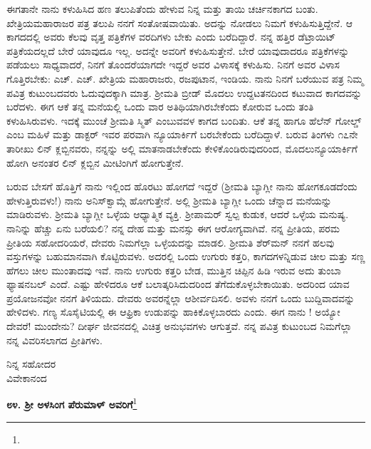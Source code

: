 ಈಗತಾನೇ ನಾನು ಕಳುಹಿಸಿದ ಹಣ ತಲುಪಿತೆಂದು ಹೇಳುವ ನಿನ್ನ ಮತ್ತು ತಾಯಿ ಚರ್ಚಿನಕಾಗದ ಬಂತು. ಖೇತ್ರಿಯಮಹಾರಾಜರ ಪತ್ರ ತಲುಪಿ ನನಗೆ ಸಂತೋಷವಾಯಿತು. ಅದನ್ನು ನೋಡಲು ನಿಮಗೆ ಕಳುಹಿಸುತ್ತಿದ್ದೇನೆ. ಆ ಕಾಗದದಲ್ಲಿ ಅವರು ಕೆಲವು ವೃತ್ತ ಪತ್ರಿಕೆಗಳ ವರದಿಗಳು ಬೇಕು ಎಂದು ಬರೆದಿದ್ದಾರೆ. ನನ್ನ ಹತ್ತಿರ ಡೆಟ್ರಾಯಿಟ್ ಪತ್ರಿಕೆಯದಲ್ಲದೆ ಬೇರೆ ಯಾವುದೂ ಇಲ್ಲ. ಅದನ್ನೇ ಅವರಿಗೆ ಕಳುಹಿಸುತ್ತೇನೆ. ಬೇರೆ ಯಾವುದಾದರೂ ಪತ್ರಿಕೆಗಳನ್ನು ಪಡೆಯಲು ಸಾಧ್ಯವಾದರೆ, ನಿನಗೆ ತೊಂದರೆಯಾಗದೇ ಇದ್ದರೆ ಅವರ ವಿಳಾಸಕ್ಕೆ ಕಳುಹಿಸು. ನಿನಗೆ ಅವರ ವಿಳಾಸ ಗೊತ್ತಿರಬೇಕು: ಎಚ್. ಎಚ್. ಖೇತ್ರಿಯ ಮಹಾರಾಜರು, ರಜಪುಟಾನ, ಇಂಡಿಯ. ನಾನು ನಿನಗೆ ಬರೆಯುವ ಪತ್ರ ನಿಮ್ಮ ಪವಿತ್ರ ಕುಟುಂಬದವರು ಓದುವುದಕ್ಕಾಗಿ ಮಾತ್ರ. ಶ‍್ರೀಮತಿ ಬ್ರೀಡ್ ಮೊದಲು ಉದ್ದಟತನದಿಂದ ಕಟುವಾದ ಕಾಗದವನ್ನು ಬರೆದಳು. ಈಗ ಆಕೆ ತನ್ನ ಮನೆಯಲ್ಲಿ ಒಂದು ವಾರ ಅತಿಥಿಯಾಗಿರಬೇಕೆಂದು ಕೋರುವ ಒಂದು ತಂತಿ ಕಳುಹಿಸಿರುವಳು. ಇದಕ್ಕೆ ಮುಂಚೆ ಶ‍್ರೀಮತಿ ಸ್ಮಿತ್ ಎಂಬುವವಳ ಕಾಗದ ಬಂದಿತು. ಆಕೆ ತನ್ನ ಹಾಗೂ ಹೆಲೆನ್ ಗೋಲ್ಡ್ ಎಂಬ ಮಹಿಳೆ ಮತ್ತು ಡಾಕ್ಟರ್ \enginline{-} ಇವರ ಪರವಾಗಿ ನ್ಯೂಯಾರ್ಕಿಗೆ ಬರಬೇಕೆಂದು ಬರೆದಿದ್ದಾಳೆ. ಬರುವ ತಿಂಗಳು ೧೭ನೇ ತಾರೀಖು ಲಿನ್ ಕ್ಲಬ್ಬಿನವರು, ನನ್ನನ್ನು ಅಲ್ಲಿ ಮಾತನಾಡಬೇಕೆಂದು ಕೇಳಿಕೊಂಡಿರುವುದರಿಂದ, ಮೊದಲುನ್ಯೂಯಾರ್ಕಿಗೆ ಹೋಗಿ ಅನಂತರ ಲಿನ್ ಕ್ಲಬ್ಬಿನ ಮೀಟಿಂಗಿಗೆ ಹೋಗುತ್ತೇನೆ.

\vspace{0.1cm}

ಬರುವ ಬೇಸಗೆ ಹೊತ್ತಿಗೆ ನಾನು ಇಲ್ಲಿಂದ ಹೊರಟು ಹೋಗದೆ ಇದ್ದರೆ (ಶ‍್ರೀಮತಿ ಬ್ಯಾಗ್ಲೀ ನಾನು ಹೋಗಕೂಡದೆಂದು ಹೇಳುತ್ತಿರುವಳು!) ನಾನು ಅನಿಸ್‌ಕ್ವಾಮ್ಗೆ ಹೋಗುತ್ತೇನೆ. ಅಲ್ಲಿ ಶ‍್ರೀಮತಿ ಬ್ಯಾಗ್ಲೀ ಒಂದು ಚೆನ್ನಾದ ಮನೆಯನ್ನು ಮಾಡಿರುವಳು. ಶ‍್ರೀಮತಿ ಬ್ಯಾಗ್ಲೀ ಒಳ್ಳೆಯ ಆಧ್ಯಾತ್ಮಿಕ ವ್ಯಕ್ತಿ. ಶ‍್ರೀಪಾಮರ್ ಸ್ವಲ್ಪ ಕುಡುಕ, ಆದರೆ ಒಳ್ಳೆಯ ಮನುಷ್ಯ. ನಾನಿನ್ನು ಹೆಚ್ಚು ಏನು ಬರೆಯಲಿ? ನನ್ನ ದೇಹ ಮತ್ತು ಮನಸ್ಸು ಈಗ ಆರೋಗ್ಯವಾಗಿವೆ. ನನ್ನ ಪ್ರೀತಿಯ, ಪರಮ ಪ್ರೀತಿಯ ಸಹೋದರಿಯರೆ, ದೇವರು ನಿಮಗೆಲ್ಲಾ ಒಳ್ಳೆಯದನ್ನು ಮಾಡಲಿ. ಶ‍್ರೀಮತಿ ಶೆರ್‌ಮನ್ ನನಗೆ ಹಲವು ವಸ್ತುಗಳನ್ನು ಬಹುಮಾನವಾಗಿ ಕೊಟ್ಟಿರುವಳು. ಅದರಲ್ಲಿ ಒಂದು ಉಗುರು ಕತ್ತರಿ, ಕಾಗದಗಳನ್ನಿಡುವ ಚೀಲ ಮತ್ತು ಸಣ್ಣ ಹೆಗಲು ಚೀಲ ಮುಂತಾದವು ಇವೆ. ನಾನು ಉಗುರು ಕತ್ತರಿ ಬೇಡ, ಮುತ್ತಿನ ಚಿಪ್ಪಿನ ಹಿಡಿ ಇರುವ ಅದು ತುಂಬಾ ಫ್ಯಾಷನಬಲ್ ಎಂದೆ. ಎಷ್ಟು ಹೇಳಿದರೂ ಆಕೆ ಬಲಾತ್ಕರಿಸಿದುದರಿಂದ ತೆಗೆದುಕೊಳ್ಳಬೇಕಾಯಿತು. ಅದರಿಂದ ಯಾವ ಪ್ರಯೋಜನವೋ ನನಗೆ ತಿಳಿಯದು. ದೇವರು ಅವರನ್ನೆಲ್ಲಾ ಆಶೀರ್ವದಿಸಲಿ. ಅವಳು ನನಗೆ ಒಂದು ಬುದ್ದಿವಾದವನ್ನು ಹೇಳಿದಳು. ಗಣ್ಯ ಸೊಸೈಟಿಯಲ್ಲಿ ಈ ಆಫ್ರಿಕಾ ಉಡುಪನ್ನು ಹಾಕಿಕೊಳ್ಳಬಾರದು ಎಂದು. ಈಗ ನಾನು ! ಅಯ್ಯೋ ದೇವರೆ! ಮುಂದೇನು? ದೀರ್ಘ ಜೀವನದಲ್ಲಿ ವಿಚಿತ್ರ ಅನುಭವಗಳು ಆಗುತ್ತವೆ. ನನ್ನ ಪವಿತ್ರ ಕುಟುಂಬದ ನಿಮಗೆಲ್ಲಾ ನನ್ನ ವಿವರಿಸಲಾಗದ ಪ್ರೀತಿಗಳು.

{\flushright
ನಿನ್ನ ಸಹೋದರ\\ವಿವೇಕಾನಂದ\par}

\newpage

\begin{center}
\textbf{೮೪. ಶ‍್ರೀ ಅಳಸಿಂಗ ಪೆರುಮಾಳ್ ಅವರಿಗೆ}\footnote{}
\end{center}

